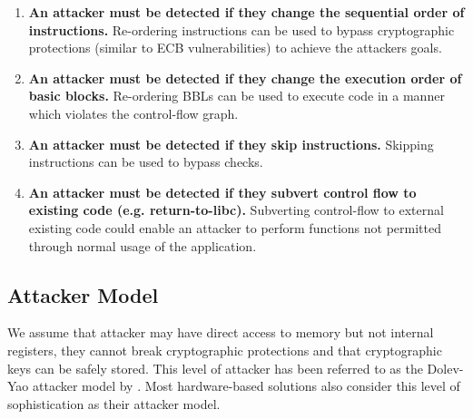 \begin{enumerate}
	\item \textbf{An attacker must be detected if they change the sequential order of instructions.} Re-ordering instructions can be used to bypass cryptographic protections (similar to ECB vulnerabilities) to achieve the attackers goals.
	\item \textbf{An attacker must be detected if they change the execution order of basic blocks.} Re-ordering BBLs can be used to execute code in a manner which violates the control-flow graph.
	\item \textbf{An attacker must be detected if they skip instructions.} Skipping instructions can be used to bypass checks.
	\item \textbf{An attacker must be detected if they subvert control flow to existing code (e.g. return-to-libc).} Subverting control-flow to external existing code could enable an attacker to perform functions not permitted through normal usage of the application.
\end{enumerate}

\subsection{Attacker Model}
We assume that attacker may have direct access to memory but not internal registers, they cannot break cryptographic protections and that cryptographic keys can be safely stored. This level of attacker has been referred to as the Dolev-Yao attacker model \cite{Dolev1981} by \cite{Lee2019}. Most hardware-based solutions also consider this level of sophistication as their attacker model.